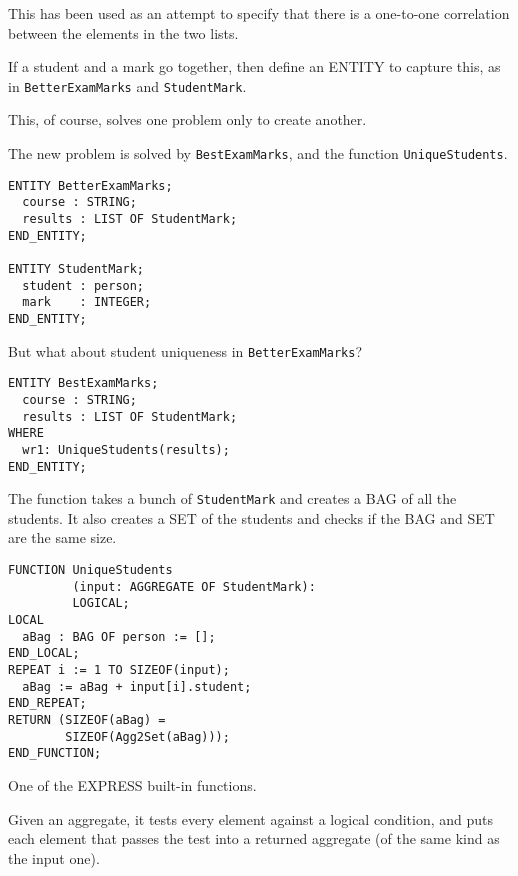     This has been used as an attempt to specify that there is a
one-to-one correlation between the elements in the two lists.


\begin{remarks}
\remintro
{}

If a student and a mark go together, then define an ENTITY to
capture this, as in \texttt{BetterExamMarks} and \texttt{StudentMark}.

    This, of course, solves one problem only to create another.

    The new problem is solved by \texttt{BestExamMarks}, and the
function \texttt{UniqueStudents}.

\remend
\end{remarks}


\begin{verbatim}
ENTITY BetterExamMarks;
  course : STRING;
  results : LIST OF StudentMark;
END_ENTITY;

ENTITY StudentMark;
  student : person;
  mark    : INTEGER;
END_ENTITY;
\end{verbatim}
But what about student uniqueness in \texttt{BetterExamMarks}?

\begin{verbatim}
ENTITY BestExamMarks;
  course : STRING;
  results : LIST OF StudentMark;
WHERE
  wr1: UniqueStudents(results);
END_ENTITY;
\end{verbatim}


\begin{remarks}
\remintro
{}

The function takes a bunch of \texttt{StudentMark} and creates a BAG
of all the students. It also creates a SET of the students and checks
if the BAG and SET are the same size.

\remend
\end{remarks}


\begin{verbatim}
FUNCTION UniqueStudents
         (input: AGGREGATE OF StudentMark): 
         LOGICAL;
LOCAL
  aBag : BAG OF person := [];
END_LOCAL;
REPEAT i := 1 TO SIZEOF(input);
  aBag := aBag + input[i].student;
END_REPEAT;
RETURN (SIZEOF(aBag) = 
        SIZEOF(Agg2Set(aBag)));
END_FUNCTION;
\end{verbatim}


\begin{remarks}
\remintro
{}

    One of the EXPRESS built-in functions.

    Given an aggregate, it tests every element against a logical condition, 
and puts each element that passes the test into a returned aggregate 
(of the same kind as the input one).


\remend
\end{remarks}

